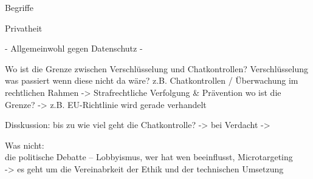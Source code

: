 Begriffe 

Privatheit 




- Allgemeinwohl gegen Datenschutz - 

Wo ist die Grenze zwischen Verschlüsselung und Chatkontrollen? 
Verschlüsselung 
was passiert wenn diese nicht da wäre? 
z.B. Chatkontrollen / Überwachung 
im rechtlichen Rahmen -> Strafrechtliche Verfolgung & Prävention 
wo ist die Grenze? 
-> z.B. EU-Richtlinie wird gerade verhandelt 

Disskussion: bis zu wie viel geht die Chatkontrolle?
-> bei Verdacht
-> 



Was nicht:\\
die politische Debatte – Lobbyismus, wer hat wen beeinflusst, Microtargeting\\
-> es geht um die Vereinabrkeit der Ethik und der technischen Umsetzung